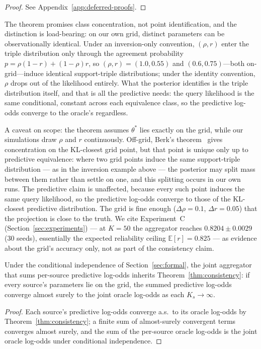 \begin{proof}
See Appendix~\ref{app:deferred-proofs}.
\end{proof}

\begin{remark}
The theorem promises class concentration, not point identification, and
the distinction is load-bearing: on our own grid, distinct parameters can
be observationally identical. Under an inversion-only convention,
$(\rho, r)$ enter the triple distribution only through the agreement
probability $p = \rho(1-r) + (1-\rho)r$, so $(\rho, r) = (1.0, 0.55)$ and
$(0.6, 0.75)$---both on-grid---induce identical support-triple
distributions; under the identity convention, $\rho$ drops out of the
likelihood entirely. What the posterior identifies is the triple
distribution itself, and that is all the predictive needs: the query
likelihood is the same conditional, constant across each equivalence
class, so the predictive log-odds converge to the oracle's regardless.

A caveat on scope: the theorem assumes $\theta^*$ lies exactly on the
grid, while our simulations draw $\rho$ and $r$ continuously. Off-grid,
Berk's theorem~\cite{berk1966} gives concentration on the KL-closest
grid point, but that point is unique only up to predictive equivalence:
where two grid points induce the same support-triple distribution ---
as in the inversion example above --- the posterior may split mass
between them rather than settle on one, and this splitting occurs in
our own runs. The predictive claim is unaffected, because every such
point induces the same query likelihood, so the predictive log-odds
converge to those of the KL-closest predictive distribution. The grid
is fine enough ($\Delta\rho = 0.1$, $\Delta r = 0.05$) that the
projection is close to the truth. We cite Experiment~C
(Section~\ref{sec:experiments}) --- at $K = 50$ the aggregator reaches
$0.8204 \pm 0.0029$ (30 seeds), essentially the expected reliability
ceiling $\mathbb{E}[r] = 0.825$ --- as evidence about the grid's
accuracy only, not as part of the consistency claim.
\end{remark}

\begin{corollary}
\label{cor:joint}
Under the conditional independence of
Section~\ref{sec:formal}, the joint aggregator that sums per-source
predictive log-odds inherits Theorem~\ref{thm:consistency}: if every
source's parameters lie on the grid, the summed predictive log-odds
converge almost surely to the joint oracle log-odds as each
$K_s \to \infty$.
\end{corollary}

\begin{proof}
Each source's predictive log-odds converge a.s.\ to its oracle
log-odds by Theorem~\ref{thm:consistency}; a finite sum of
almost-surely convergent terms converges almost surely, and the sum
of the per-source oracle log-odds is the joint oracle log-odds under
conditional independence.
\end{proof}
